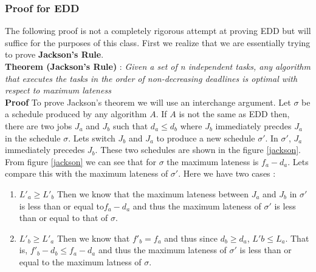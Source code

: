 \documentclass{hw}
\begin{document}
\subsubsection{Proof for EDD}
The following proof is not a completely rigorous attempt at proving EDD but
will suffice for the purposes of this class. First we realize that we are
essentially trying to prove \textbf{Jackson's Rule}. \\

\textbf{Theorem (Jackson's Rule)} : \textit{Given a set of n independent tasks,
any algorithm that executes the tasks in the order of non-decreasing deadlines
is optimal with respect to maximum lateness} \\

\textbf{Proof} To prove Jackson's theorem we will use an interchange argument.
Let $\sigma$ be a schedule produced by any algorithm $A$. If $A$ is not the
same as EDD then, there are two jobs $J_a$ and $J_b$ such that $d_a \leq d_b$
where $J_b$ immediately precdes $J_a$ in the schedule $\sigma$. Lets switch
$J_b$ and $J_a$ to produce a new schedule $\sigma '$. In $\sigma '$, $J_a$
immediately precedes $J_b$. These two schedules are shown in the figure
\ref{jackson}. \\

From figure \ref{jackson} we can see that for $\sigma$ the maximum lateness is
$f_a - d_a$. Lets compare this with the maximum lateness of $\sigma '$. Here we
have two cases :

\begin{enumerate}
  \item $L'_a \geq L'_b$ Then we know that the maximum lateness between $J_a$
    and $J_b$ in $\sigma '$ is less than or equal to$f_a - d_a$ and thus the
    maximum lateness of $\sigma '$ is less than or equal to that of $\sigma$.
  \item $L'_b \geq L'_a$ Then we know that $f'_b = f_a$ and thus since $d_b
    \geq d_a$, $L'b \leq L_a$. That is, $f'_b - d_b \leq f_a - d_a$ and thus
    the maximum lateness of $\sigma '$ is less than or equal to the maximum
    latness of $\sigma$.
\end{enumerate}
\end{document}
